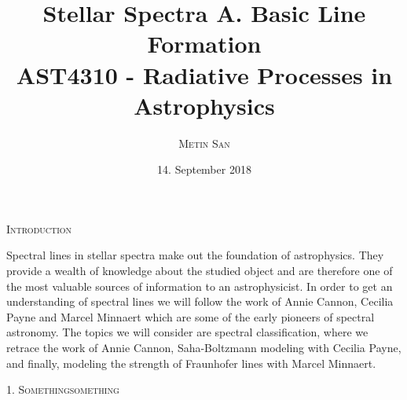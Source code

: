 \documentclass[a4paper,11.5pt,]{article}
\title{Stellar Spectra A. Basic Line Formation\\
 AST4310 - Radiative Processes in Astrophysics}
\date{\normalsize{14. September 2018} }
\author{\textsc{\small{Metin San}}}
\begin{document}
\maketitle
\begin{center}
\textsc{Introduction}
\end{center}


\begin{adjustwidth}{1cm}{1cm}

Spectral lines in stellar spectra make out the foundation of astrophysics. They provide a wealth of knowledge about the studied object and are therefore one of the most valuable sources of information to an astrophysicist. In order to get an understanding of spectral lines we will follow the work of Annie Cannon, Cecilia Payne and Marcel Minnaert which are some of the early pioneers of spectral astronomy. The topics we will consider are spectral classification, where we retrace the work of Annie Cannon, Saha-Boltzmann modeling with Cecilia Payne, and finally, modeling the strength of Fraunhofer lines with Marcel Minnaert.
\end{adjustwidth}
\begin{multicols}{2}

\begin{center}
\textsc{1. Somethingsomething}
\end{center}




\end{multicols}
\end{document}
